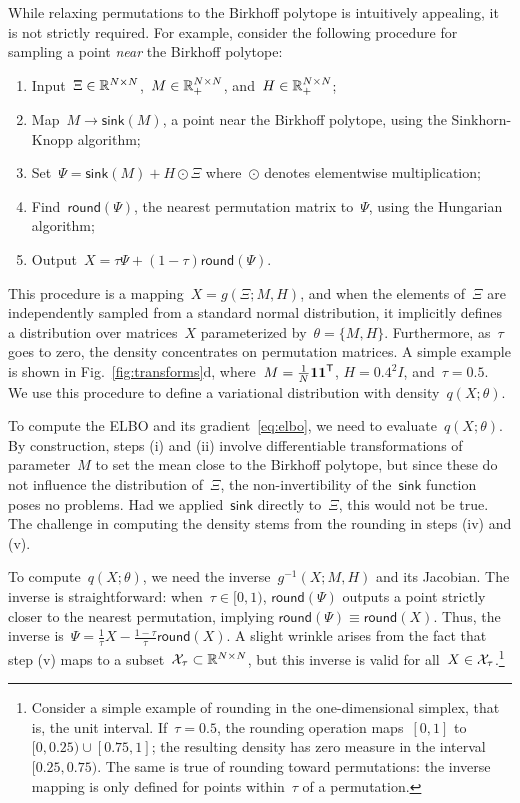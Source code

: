 \documentclass[twoside]{article}
\begin{document}
While relaxing permutations to the Birkhoff polytope is intuitively
appealing, it is not strictly required.  For example, consider the
following procedure for sampling a point \emph{near} the Birkhoff
polytope:
\begin{enumerate}[label=(\roman*)]
\item Input~${\Xi \in \mathbb{R}^{N \times N}}$,~${M \in \mathbb{R}_+^{N \times N}}$, and~${H \in \mathbb{R}_+^{N \times N}}$;
\item Map~$M \to \mathsf{sink}(M)$, a point near the Birkhoff polytope, using the Sinkhorn-Knopp algorithm;
\item Set~${\Psi = \mathsf{sink}(M) + H \odot \Xi}$ where~$\odot$ denotes elementwise multiplication;
\item Find~$\mathsf{round}(\Psi)$, the nearest permutation matrix to~$\Psi$, using the Hungarian algorithm;
\item Output~${X = \tau \Psi + (1-\tau) \mathsf{round}(\Psi)}$.
\end{enumerate}
This procedure is a mapping~$X = g(\Xi; M, H)$, and when the elements
of~$\Xi$ are independently sampled from a standard normal
distribution, it implicitly defines a distribution over matrices~$X$
parameterized by~${\theta = \{M, H\}}$. Furthermore, as~$\tau$ goes to
zero, the density concentrates on permutation matrices.  A simple
example is shown in Fig.~\ref{fig:transforms}d,
where~${M = \tfrac{1}{N}\boldsymbol{1} \boldsymbol{1}^{\mathsf{T}}}$, ${H = 0.4^2 I}$,
and~${\tau=0.5}$. We use this procedure to define a variational
distribution with density~$q(X; \theta)$.

To compute the ELBO and its gradient~\eqref{eq:elbo}, we need to
evaluate~$q(X; \theta)$.  By construction, steps (i) and (ii) involve
differentiable transformations of parameter~$M$ to set the mean close
to the Birkhoff polytope, but since these do not influence the
distribution of~$\Xi$, the non-invertibility of
the~$\mathsf{sink}$ function poses no problems.  Had
we applied~$\mathsf{sink}$ directly to~$\Xi$, this would not be true.
The challenge in computing the density stems from the rounding in
steps (iv) and (v).

To compute~$q(X; \theta)$, we need the inverse~$g^{-1}(X; M, H)$ and its
Jacobian.  The inverse is straightforward: when~${\tau \in [0,1)}$,
$\mathsf{round}(\Psi)$ outputs a point strictly closer to the nearest
permutation, implying
${\mathsf{round}(\Psi) \equiv \mathsf{round}(X)}$.  Thus, the inverse
is~${\Psi = \tfrac{1}{\tau}X - \tfrac{1-\tau}{\tau}
  \mathsf{round}(X)}$.  A slight wrinkle arises from the fact that
step (v) maps to a subset~$\mathcal{X}_\tau \subset \mathbb{R}^{N \times N}$, but
this inverse is valid for all~$X \in \mathcal{X}_\tau$.\footnote{Consider a
  simple example of rounding in the one-dimensional simplex, that is,
  the unit interval.  If~$\tau = 0.5$, the rounding operation
  maps~$[0,1]$ to~${[0,0.25) \cup [0.75, 1]}$; the resulting density
  has zero measure in the interval~$[0.25, 0.75)$.  The same is true
  of rounding toward permutations: the inverse mapping is only defined
  for points within~$\tau$ of a permutation. }
\end{document}
